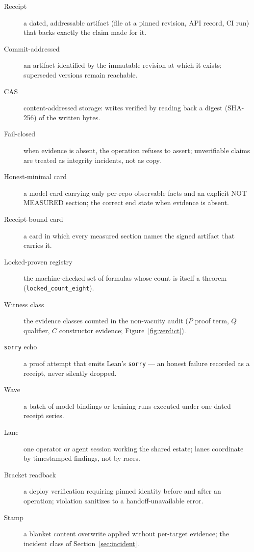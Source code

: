 \begin{description}
\item[Receipt] a dated, addressable artifact (file at a pinned revision, API record, CI run) that backs exactly the claim made for it.
\item[Commit-addressed] an artifact identified by the immutable revision at which it exists; superseded versions remain reachable.
\item[CAS] content-addressed storage: writes verified by reading back a digest (SHA-256) of the written bytes.
\item[Fail-closed] when evidence is absent, the operation refuses to assert; unverifiable claims are treated as integrity incidents, not as copy.
\item[Honest-minimal card] a model card carrying only per-repo observable facts and an explicit NOT MEASURED section; the correct end state when evidence is absent.
\item[Receipt-bound card] a card in which every measured section names the signed artifact that carries it.
\item[Locked-proven registry] the machine-checked set of formulas whose count is itself a theorem (\texttt{locked\_count\_eight}).
\item[Witness class] the evidence classes counted in the non-vacuity audit ($P$ proof term, $Q$ qualifier, $C$ constructor evidence; Figure~\ref{fig:verdict}).
\item[\texttt{sorry} echo] a proof attempt that emits Lean's \texttt{sorry} --- an honest failure recorded as a receipt, never silently dropped.
\item[Wave] a batch of model bindings or training runs executed under one dated receipt series.
\item[Lane] one operator or agent session working the shared estate; lanes coordinate by timestamped findings, not by races.
\item[Bracket readback] a deploy verification requiring pinned identity before and after an operation; violation sanitizes to a handoff-unavailable error.
\item[Stamp] a blanket content overwrite applied without per-target evidence; the incident class of Section~\ref{sec:incident}.
\end{description}



